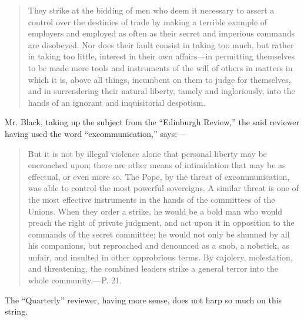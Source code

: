 \begin{quote}
    \hspace{2em} They strike at the bidding of men who deem it necessary
    to assert a control over the destinies of trade by making a terrible
    example of employers and employed as often as their secret and
    imperious commands are disobeyed. Nor does their fault consist in
    taking too much, but rather in taking too little, interest in their
    own affairs---in permitting themselves to be made mere tools and
    instruments of the will of others in matters in which it is, above
    all things, incumbent on them to judge for themselves, and in
    surrendering their natural liberty, tamely and ingloriously, into
    the hands of an ignorant and inquisitorial despotism.
\end{quote}

Mr. Black, taking up the subject from the ``Edinburgh Review,'' the said
reviewer having used the word ``excommunication,'' says:---

\begin{quote}
    \hspace{2em} But it is not by illegal violence alone that personal
    liberty may be encroached upon; there are other means of
    intimidation that may be as effectual, or even more so. The Pope, by
    the threat of excommunication, was able to control the most powerful
    sovereigns. A similar threat is one of the most effective
    instruments in the hands of the committees of the Unions. When they
    order a strike, he would be a bold man who would preach the right of
    private judgment, and act upon it in opposition to the commands of
    the secret committee; he would not only be shunned by all his
    companions, but reproached and denounced as a snob, a nobstick, as
    unfair, and insulted in other opprobrious terms. By cajolery,
    molestation, and threatening, the combined leaders strike a general
    terror into the whole community.---P. 21.
\end{quote}

The ``Quarterly'' reviewer, having more sense, does not harp so much on
this string.

